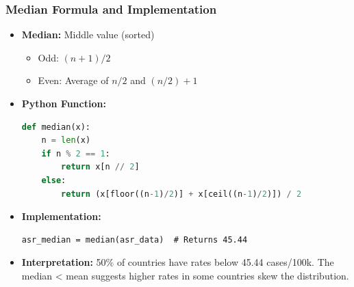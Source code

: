 \begin{frame}[fragile]
    \frametitle{Median Formula and Implementation}
    \begin{itemize}
        \item \textbf{Median:} Middle value (sorted)
      \begin{itemize}
       \item Odd: $(n+1)/2$
       \item Even: Average of $n/2$ and $(n/2)+1$
      \end{itemize}
        
        \item \textbf{Python Function:}
        \begin{lstlisting}[language=Python, breaklines=true]
def median(x):
    n = len(x)
    if n % 2 == 1:
        return x[n // 2]
    else:
        return (x[floor((n-1)/2)] + x[ceil((n-1)/2)]) / 2
        \end{lstlisting}
        
        \item \textbf{Implementation:}
        \begin{lstlisting}
asr_median = median(asr_data)  # Returns 45.44
        \end{lstlisting}
        
        \item \textbf{Interpretation:} 50\% of countries have rates below 45.44 cases/100k. The median < mean suggests higher rates in some countries skew the distribution.
    \end{itemize}
\end{frame}

